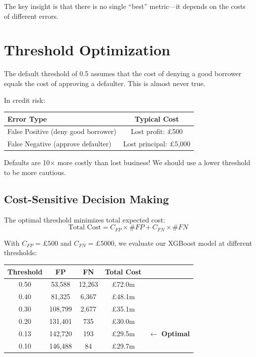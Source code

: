 \documentclass[11pt,a4paper]{article}
\begin{document}
The key insight is that there is no single ``best'' metric---it depends on the costs of different errors.

\section{Threshold Optimization}
The default threshold of 0.5 assumes that the cost of denying a good borrower equals the cost of approving a defaulter. This is almost never true.

In credit risk:
\begin{center}
\begin{tabular}{lc}
\toprule
\textbf{Error Type} & \textbf{Typical Cost} \\
\midrule
False Positive (deny good borrower) & Lost profit: £500 \\
False Negative (approve defaulter) & Lost principal: £5,000 \\
\bottomrule
\end{tabular}
\end{center}

Defaults are 10$\times$ more costly than lost business! We should use a lower threshold to be more cautious.

\subsection{Cost-Sensitive Decision Making}

The optimal threshold minimizes total expected cost:
\[
\text{Total Cost} = C_{FP} \times \#FP + C_{FN} \times \#FN
\]

With $C_{FP} = \pounds500$ and $C_{FN} = \pounds5000$, we evaluate our XGBoost model at different thresholds:

\begin{center}
\begin{tabular}{ccccc}
\toprule
\textbf{Threshold} & \textbf{FP} & \textbf{FN} & \textbf{Total Cost} & \\
\midrule
0.50 & 53,588 & 12,263 & £72.0m & \\
0.40 & 81,325 & 6,367 & £48.1m & \\
0.30 & 108,799 & 2,677 & £35.1m & \\
0.20 & 131,401 & 735 & £30.0m & \\
0.13 & 142,720 & 193 & £29.5m & $\leftarrow$ \textbf{Optimal} \\
0.10 & 146,488 & 84 & £29.7m & \\
\bottomrule
\end{tabular}
\end{center}
\end{document}
